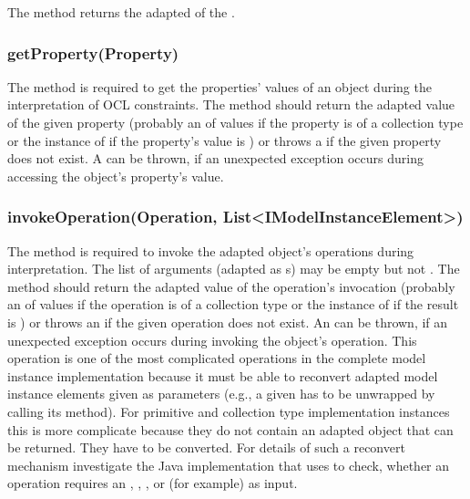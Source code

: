 The method  returns the adapted  of the 
.

\subsubsection{getProperty(Property)}

The method  is required to get the properties'
values of an object during the interpretation of OCL constraints. The method
should return the adapted value of the given property (probably an
 of values if the property is of a collection
type or the instance of  if the property's value is
) or throws a  if the
given property does not exist. A  can be thrown,
if an unexpected exception occurs during accessing the object's property's
value.

\subsubsection{invokeOperation(Operation, List<IModelInstanceElement>)}
			
The method  is 
required to invoke the adapted object's operations during interpretation. The 
list of arguments (adapted as s) may be empty but
not . The method should return the adapted value of the operation's 
invocation (probably an  of values if the 
operation is of a collection type or the instance of 
if the result is ) or throws an  if
the given operation does not exist. An 
can be thrown, if an unexpected exception occurs during invoking the object's
operation. This operation is one of the most complicated operations in the 
complete model instance implementation because it must be able to reconvert 
adapted model instance elements given as parameters (e.g., a given 
 has to be unwrapped by calling its 
 method). For primitive and collection type implementation 
instances this is more complicate because they do not contain an adapted object 
that can be returned. They have to be converted. For details of such a reconvert
mechanism investigate the Java implementation that uses  to check, whether an operation requires an , 
, , or  (for example) as input.


